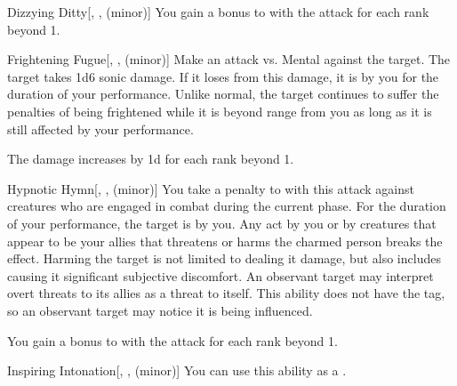 {\begin{freeability}{Dizzying Ditty}[, ,  (minor)]
                \rankline
                You gain a  bonus to  with the attack for each rank beyond 1.
            \end{freeability}

            \begin{freeability}{Frightening Fugue}[, ,  (minor)]
                Make an attack vs. Mental against the target.
                \hit The target takes 1d6 sonic damage.
                If it loses  from this damage, it is  by you for the duration of your performance.
                Unlike normal, the target continues to suffer the penalties of being frightened while it is beyond \rngmed range from you as long as it is still affected by your performance.

                \rankline
                The damage increases by \plus1d for each rank beyond 1.
            \end{freeability}

            \begin{freeability}{Hypnotic Hymn}[, ,  (minor)]
                You take a  penalty to  with this attack against creatures who are engaged in combat during the current phase.
                \hit For the duration of your performance, the target is  by you.
                Any act by you or by creatures that appear to be your allies that threatens or harms the charmed person breaks the effect.
                Harming the target is not limited to dealing it damage, but also includes causing it significant subjective discomfort.
                An observant target may interpret overt threats to its allies as a threat to itself.
                This ability does not have the  tag, so an observant target may notice it is being influenced.

                \rankline
                You gain a  bonus to  with the attack for each rank beyond 1.
            \end{freeability}

            \begin{freeability}{Inspiring Intonation}[, ,  (minor)]
                You can use this ability as a .


\end{freeability}}

